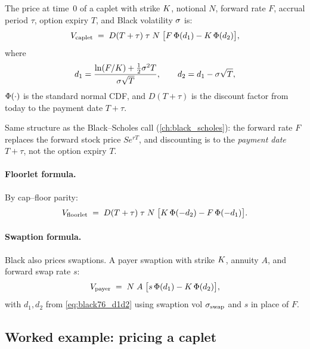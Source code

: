 \begin{keyfactbox}
The price at time~0 of a caplet with strike $K$, notional $N$,
forward rate $F$, accrual period $\tau$, option expiry $T$, and
Black volatility $\sigma$ is:
\begin{equation}
  V_{\text{caplet}} \;=\; D(T+\tau)\;\tau\;N\;\bigl[F\,\Phi(d_1) - K\,\Phi(d_2)\bigr],
  \label{eq:black76_caplet}
\end{equation}
where
\begin{equation}
  d_1 = \frac{\ln(F/K) + \tfrac{1}{2}\sigma^2 T}{\sigma\sqrt{T}},
  \qquad
  d_2 = d_1 - \sigma\sqrt{T},
  \label{eq:black76_d1d2}
\end{equation}
$\Phi(\cdot)$ is the standard normal CDF, and $D(T+\tau)$ is the
discount factor from today to the payment date $T+\tau$.
\end{keyfactbox}

Same structure as the Black--Scholes call (\cref{ch:black_scholes}):
the forward rate $F$ replaces the forward stock price $Se^{rT}$, and
discounting is to the \emph{payment date} $T+\tau$, not the option
expiry $T$.

\paragraph{Floorlet formula.}
By cap--floor parity:
\begin{equation}
  V_{\text{floorlet}} \;=\; D(T+\tau)\;\tau\;N\;\bigl[K\,\Phi(-d_2) - F\,\Phi(-d_1)\bigr].
  \label{eq:black76_floorlet}
\end{equation}

\paragraph{Swaption formula.}
Black also prices swaptions.  A payer swaption with strike $K$,
annuity $A$, and forward swap rate $s$:
\begin{equation}
  V_{\text{payer}} \;=\; N\;A\;\bigl[s\,\Phi(d_1) - K\,\Phi(d_2)\bigr],
  \label{eq:black_swaption}
\end{equation}
with $d_1, d_2$ from \cref{eq:black76_d1d2} using swaption vol
$\sigma_{\text{swap}}$ and $s$ in place of $F$.

\subsection{Worked example: pricing a caplet}
\label{sec:caplet_worked}

